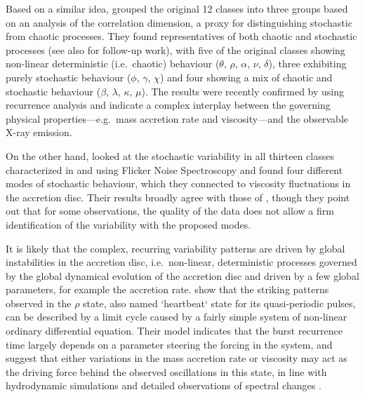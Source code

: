 \documentclass[12pt]{emulateapj}
\begin{document}
Based on a similar idea, \citet{misra2004, misra2006} grouped the original 12 classes into three groups based on an analysis of the correlation dimension, a proxy for distinguishing stochastic from chaotic processes. They found representatives of both chaotic and stochastic processes (see also \citealt{harikrishnan2011} for follow-up work), with five of the original classes showing non-linear deterministic (i.e.\ chaotic) behaviour ($\theta$, $\rho$, $\alpha$, $\nu$, $\delta$), three exhibiting purely stochastic behaviour ($\phi$, $\gamma$, $\chi$) and four showing a mix of chaotic and stochastic behaviour ($\beta$, $\lambda$, $\kappa$, $\mu$). The results were recently confirmed by \citet{sukova2016} using recurrence analysis and indicate a complex interplay between the governing physical properties---e.g.\ mass accretion rate and viscosity---and the observable X-ray emission.

On the other hand, \citet{polyakov2012} looked at the stochastic variability in all thirteen classes characterized in \citet{belloni2000} and \citet{kleinwolt2002} using Flicker Noise Spectroscopy and found four different modes of stochastic behaviour, which they connected to viscosity fluctuations in the accretion disc. Their results broadly agree with those of \citet{misra2006}, though they point out that for some observations, the quality of the data does not allow a firm identification of the variability with the proposed modes.

It is likely that the complex, recurring variability patterns are driven by global instabilities in the accretion disc, i.e.\ non-linear, deterministic processes governed by the global dynamical evolution of the accretion disc and driven by a few global parameters, for example the accretion rate. \citet{massaro2014} show that the striking patterns observed in the $\rho$ state, also named `heartbeat` state for its quasi-periodic pulses, can be described by a limit cycle caused by a fairly simple system of non-linear ordinary differential equation. Their model indicates that the burst recurrence time largely depends on a parameter steering the forcing in the system, and suggest that either variations in the mass accretion rate or viscosity may act as the driving force behind the observed oscillations in this state, in line with hydrodynamic simulations \citep{nayakshin2000, merloni2006} and detailed observations of spectral changes \citep{neilsen2011, neilsen2012}.
\end{document}
